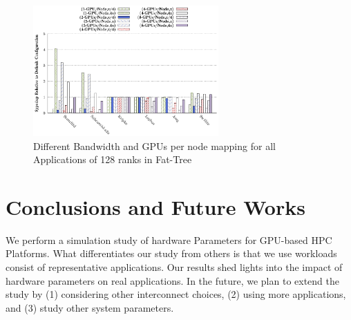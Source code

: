 \documentclass[conference]{IEEEtran}
\begin{document}
\begin{figure}[H]
\centering
\centering
\includegraphics[width=1\linewidth, height=5cm]{figs/ftree-bw-mapping-all.eps}
\vspace{-0.15in}
\caption{Different  Bandwidth and GPUs per node mapping for all Applications of 128 ranks in Fat-Tree}
\label{bw2}
\end{figure}

\section{Conclusions and Future Works}

We perform a simulation study of hardware Parameters for GPU-based HPC Platforms. What
differentiates our study from others is that we use workloads consist of representative
applications. Our results shed lights into the impact of hardware parameters on real
applications. In the future, we plan to extend the study by (1) considering other
interconnect choices, (2) using more applications, and (3) study other system parameters.

%
\end{document}
